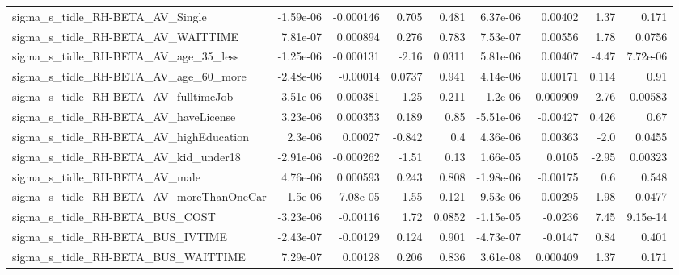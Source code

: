 \begin{tabular}{lrrrrrrrr}
sigma\_s\_tidle\_RH-BETA\_AV\_Single                    &   -1.59e-06 &    -0.000146 &     0.705 &    0.481 &   6.37e-06 &     0.00402 &         1.37 &         0.171 \\
sigma\_s\_tidle\_RH-BETA\_AV\_WAITTIME                  &    7.81e-07 &     0.000894 &     0.276 &    0.783 &   7.53e-07 &     0.00556 &         1.78 &        0.0756 \\
sigma\_s\_tidle\_RH-BETA\_AV\_age\_35\_less               &   -1.25e-06 &    -0.000131 &     -2.16 &   0.0311 &   5.81e-06 &     0.00407 &        -4.47 &      7.72e-06 \\
sigma\_s\_tidle\_RH-BETA\_AV\_age\_60\_more               &   -2.48e-06 &     -0.00014 &    0.0737 &    0.941 &   4.14e-06 &     0.00171 &        0.114 &          0.91 \\
sigma\_s\_tidle\_RH-BETA\_AV\_fulltimeJob               &    3.51e-06 &     0.000381 &     -1.25 &    0.211 &   -1.2e-06 &   -0.000909 &        -2.76 &       0.00583 \\
sigma\_s\_tidle\_RH-BETA\_AV\_haveLicense               &    3.23e-06 &     0.000353 &     0.189 &     0.85 &  -5.51e-06 &    -0.00427 &        0.426 &          0.67 \\
sigma\_s\_tidle\_RH-BETA\_AV\_highEducation             &     2.3e-06 &      0.00027 &    -0.842 &      0.4 &   4.36e-06 &     0.00363 &         -2.0 &        0.0455 \\
sigma\_s\_tidle\_RH-BETA\_AV\_kid\_under18               &   -2.91e-06 &    -0.000262 &     -1.51 &     0.13 &   1.66e-05 &      0.0105 &        -2.95 &       0.00323 \\
sigma\_s\_tidle\_RH-BETA\_AV\_male                      &    4.76e-06 &     0.000593 &     0.243 &    0.808 &  -1.98e-06 &    -0.00175 &          0.6 &         0.548 \\
sigma\_s\_tidle\_RH-BETA\_AV\_moreThanOneCar            &     1.5e-06 &     7.08e-05 &     -1.55 &    0.121 &  -9.53e-06 &    -0.00295 &        -1.98 &        0.0477 \\
sigma\_s\_tidle\_RH-BETA\_BUS\_COST                     &   -3.23e-06 &     -0.00116 &      1.72 &   0.0852 &  -1.15e-05 &     -0.0236 &         7.45 &      9.15e-14 \\
sigma\_s\_tidle\_RH-BETA\_BUS\_IVTIME                   &   -2.43e-07 &     -0.00129 &     0.124 &    0.901 &  -4.73e-07 &     -0.0147 &         0.84 &         0.401 \\
sigma\_s\_tidle\_RH-BETA\_BUS\_WAITTIME                 &    7.29e-07 &      0.00128 &     0.206 &    0.836 &   3.61e-08 &    0.000409 &         1.37 &         0.171 \\

\end{tabular}
